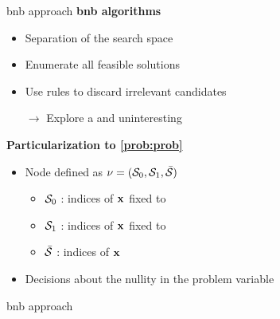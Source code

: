 \documentclass[10pt]{beamer}
\begin{document}
\begin{frame}{\gls{bnb} approach}
  \textbf{\gls{bnb} algorithms}
  \begin{itemize}
    \item Separation of the search space
    \item Enumerate all feasible solutions
    \item Use rules to discard irrelevant candidates
    \item[$\rightarrow$] Explore a  and  uninteresting 
  \end{itemize}
  \pause
  \textbf{Particularization to \eqref{prob:prob}}
  \begin{itemize}
    \item Node defined as $\nu = (\mathcal{S}_0,\mathcal{S}_1,\bar{\mathcal{S}})$
    \begin{itemize}
      \item $\mathcal{S}_0$ : indices of $\pv$ fixed to 
      \item $\mathcal{S}_1$ : indices of $\pv$ fixed to 
      \item $\bar{\mathcal{S}}$ : indices of $\pv$ 
    \end{itemize}
    \item Decisions about the nullity in the problem variable
  \end{itemize}
\end{frame}

\begin{frame}{\gls{bnb} approach}
\end{frame}
\end{document}
